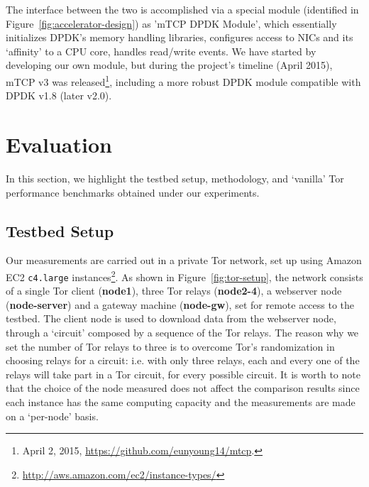 \documentclass[conference]{IEEEtran}
\begin{document}
The interface between the two is accomplished via a
special module (identified in Figure~\ref{fig:accelerator-design}) as 'mTCP DPDK Module', 
which essentially initializes DPDK's memory handling libraries, configures access to NICs and its 
`affinity' to a CPU core, handles read\slash write events. We have started by developing our 
own module, but during the project's timeline (April 2015), mTCP v3 was released\footnote{April 2, 2015, \url{https://github.com/eunyoung14/mtcp}.}, including a more robust DPDK module compatible with DPDK v1.8 (later v2.0). 


\section{Evaluation}
\label{sec:evaluation}

In this section, we highlight the testbed setup, methodology, and `vanilla' Tor performance benchmarks obtained under our experiments.

\subsection{Testbed Setup}
\label{subsec:testbed}

Our measurements are carried out in a private Tor network, set up using Amazon EC2 \verb+c4.large+ instances\footnote{\url{http://aws.amazon.com/ec2/instance-types/}}. As shown in Figure~\ref{fig:tor-setup}, the network consists of a single Tor client (\textbf{node1}), three Tor relays (\textbf{node2-4}), a webserver node (\textbf{node-server}) and a gateway machine (\textbf{node-gw}), set for remote access to the testbed. The client node is used to download data from the webserver node, through a `circuit' composed by a sequence of the Tor relays. The reason why we set the number of Tor relays to three is to overcome Tor's randomization in choosing relays for a circuit: i.e. with only three relays, each and every one of the relays will take part in a Tor circuit, for every possible circuit. It is worth to note that the choice of the node measured does not affect the comparison results since each instance has the same computing capacity and the measurements are made on a `per-node' basis.
\end{document}
